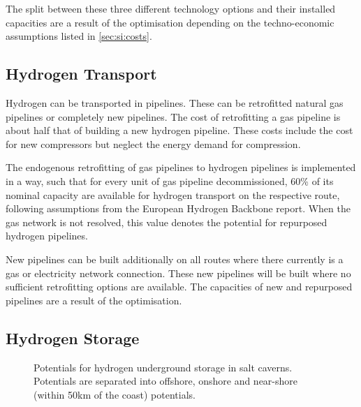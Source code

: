 The split between these three different technology
options and their installed capacities are a result of the optimisation
depending on the techno-economic assumptions listed in \cref{sec:si:costs}.

\subsection{Hydrogen Transport}
\label{sec:si:h2:transport}

Hydrogen can be transported in pipelines. These can be retrofitted natural gas
pipelines or completely new pipelines. The cost of retrofitting a gas pipeline
is about half that of building a new hydrogen pipeline. These costs include the
cost for new compressors but neglect the energy demand for compression.

The endogenous retrofitting of gas pipelines to hydrogen pipelines is
implemented in a way, such that for every unit of gas pipeline decommissioned,
60\% of its nominal capacity are available for hydrogen transport on the
respective route, following assumptions from the European Hydrogen Backbone
report. When the gas network is not
resolved, this value denotes the potential for repurposed hydrogen pipelines.

New pipelines can be built additionally on all routes where there currently is a
gas or electricity network connection. These new pipelines will be built where
no sufficient retrofitting options are available. The capacities of new and
repurposed pipelines are a result of the optimisation.

\subsection{Hydrogen Storage}
\label{sec:si:h2:storage}

\begin{figure}
    \centering
    \caption{Potentials for hydrogen underground storage in salt caverns. Potentials are separated into offshore, onshore and near-shore (within 50km of the coast) potentials.}
    \label{fig:clustered-caverns}
\end{figure}

